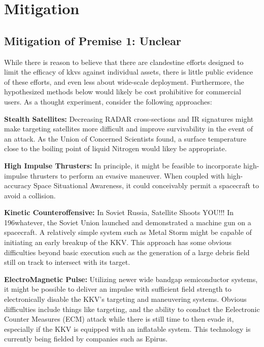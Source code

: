 \section{Mitigation}

\subsection{Mitigation of Premise 1: Unclear}
While there is reason to believe that there are clandestine efforts
designed to limit the efficacy of \acp{kkv} against individual assets,
there is little public evidence of these efforts, and even less about
wide-scale deployment.  Furthermore, the hypothesized methods below
would likely be cost prohibitive for commercial users.  As a thought
experiment, consider the following approaches:

\textbf{Stealth Satellites:} Decreasing RADAR cross-sections and IR
signatures might make targeting satellites more difficult and improve
survivability in the event of an attack.  As the Union of Concerned
Scientists found, a surface temperature close to the boiling point of
liquid Nitrogen would likey be appropriate.\cite[p48]{abm-me-not}

\textbf{High Impulse Thrusters:} In principle, it might be feasible to
incorporate high-impulse thrusters to perform an evasive maneuver.
When coupled with high-accuracy Space Situational Awareness, it could
conceivably permit a spacecraft to avoid a collision.

\textbf{Kinetic Counteroffensive:} In Soviet Russia, Satellite Shoots
YOU!!!  In 196whatever, the Soviet Union launched and demonstrated a
machine gun on a spacecraft.  A relatively simple system such as Metal
Storm might be capable of initiating an early breakup of the KKV.
This approach has some obvious difficulties beyond basic execution
such as the generation of a large debris field still on track to
intersect with its target.

\textbf{ElectroMagnetic Pulse:} Utilizing newer wide bandgap
semiconductor systems, it might be possible to deliver an impulse with
sufficient field strength to electronically disable the KKV's
targeting and maneuvering systems.  Obvious difficulties include
things like targeting, and the ability to conduct the Eelectronic
Counter Measures (ECM) attack while there is still time to then evade
it, especially if the KKV is equipped with an inflatable system.  This
technology is currently being fielded by companies such as
Epirus.\cite[epirus]{fixme}

